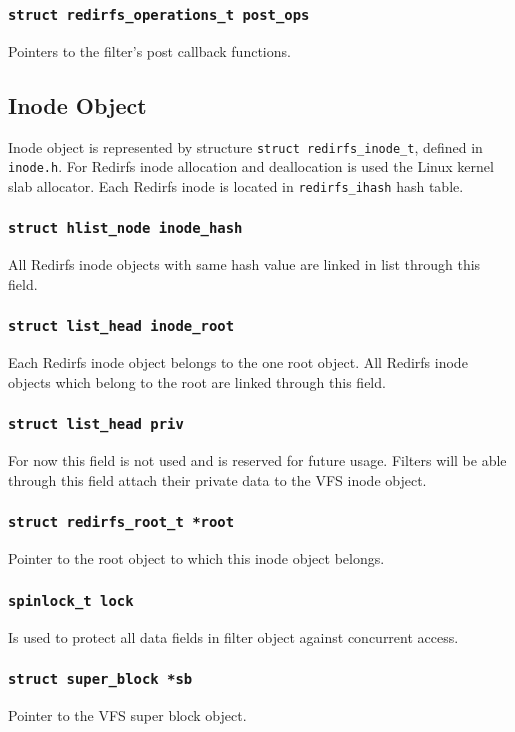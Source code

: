 \subsubsection{\texttt{struct redirfs\_operations\_t post\_ops}}
Pointers to the filter's post callback functions.

\subsection{Inode Object}
Inode object is represented by structure \texttt{struct redirfs\_inode\_t}, defined in
\texttt{inode.h}. For Redirfs inode allocation and deallocation is used the Linux
kernel slab allocator. Each Redirfs inode is located in \texttt{redirfs\_ihash} hash
table.

\subsubsection{\texttt{struct hlist\_node inode\_hash}}
All Redirfs inode objects with same hash value are linked in list through this field.

\subsubsection{\texttt{struct list\_head inode\_root}}
Each Redirfs inode object belongs to the one root object. All Redirfs inode objects
which belong to the root are linked through this field.

\subsubsection{\texttt{struct list\_head priv}}
For now this field is not used and is reserved for future usage. Filters will be able
through this field attach their private data to the VFS inode object.

\subsubsection{\texttt{struct redirfs\_root\_t *root}}
Pointer to the root object to which this inode object belongs.

\subsubsection{\texttt{spinlock\_t lock}}
Is used to protect all data fields in filter object against concurrent access.

\subsubsection{\texttt{struct super\_block *sb}}
Pointer to the VFS super block object.

